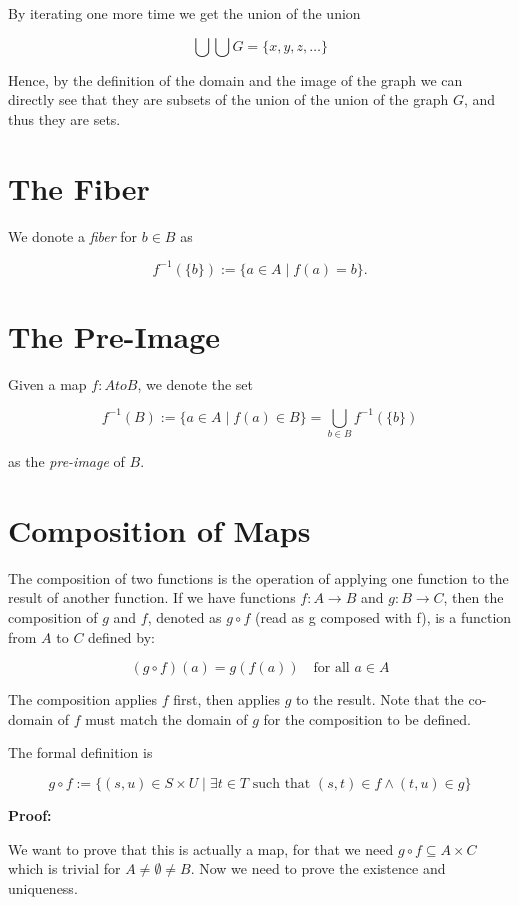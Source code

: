 By iterating one more time we get the union of the union

\[
	\bigcup \bigcup G = \{x, y, z, \dots\}
\]

Hence, by the definition of the domain and the image of the graph we can directly see that they are subsets of the union of the union of the graph 
\(G\), and thus they are sets.

\QED

\section{The Fiber}

We donote a \emph{fiber} for \(b \in B\) as 

\[
	f^{-1}(\{b\}) := \{a \in A \mid f(a) = b\}.
\]

\section{The Pre-Image}

Given a map \(f: A to B\), we denote the set 

\[
	f^{-1}(B) := \{a \in A \mid f(a) \in B\} = \bigcup_{b \in B} f^{-1}(\{b\})
\]

as the \emph{pre-image} of \(B\).

\section{Composition of Maps}

The composition of two functions is the operation of applying one function to the result of another 
function. If we have functions \(f: A \to B\) and \(g: B \rightarrow C\), then the composition of \(g\) 
and \(f\), denoted as \(g \circ f\) (read as g composed with f), is a function from \(A\) to \(C\) defined 
by:

\[
	(g \circ f)(a) = g(f(a)) \quad \text{for all } a \in A
\]

The composition applies \(f\) first, then applies \(g\) to the result. 
Note that the co-domain of \(f\) must match the domain of \(g\) for the composition to be defined.

The formal definition is 

\[
	g \circ f := \{ (s, u) \in S \times U \mid \exists t \in T \text{ such that } (s, t) \in f \land (t, u) \in g \}
\]

\textbf{Proof:}

We want to prove that this is actually a map, for that we need \(g \circ f \subseteq A \times C\) which is trivial 
for \(A \neq \emptyset \neq B\). Now we need to prove the existence and uniqueness. 

